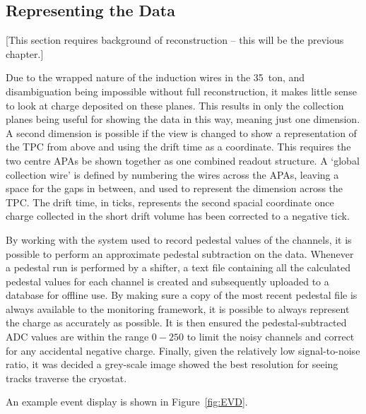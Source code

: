 \subsection{Representing the Data}\label{RepresentingEVDData}

[This section requires background of reconstruction -- this will be the previous chapter.]

Due to the wrapped nature of the induction wires in the 35~ton, and disambiguation being impossible without full reconstruction, it makes little sense to look at charge deposited on these planes.  This results in only the collection planes being useful for showing the data in this way, meaning just one dimension.  A second dimension is possible if the view is changed to show a representation of the TPC from above and using the drift time as a coordinate.  This requires the two centre APAs be shown together as one combined readout structure.  A `global collection wire' is defined by numbering the wires across the APAs, leaving a space for the gaps in between, and used to represent the dimension across the TPC.  The drift time, in ticks, represents the second spacial coordinate once charge collected in the short drift volume has been corrected to a negative tick.

By working with the system used to record pedestal values of the channels, it is possible to perform an approximate pedestal subtraction on the data.  Whenever a pedestal run is performed by a shifter, a text file containing all the calculated pedestal values for each channel is created and subsequently uploaded to a database for offline use.  By making sure a copy of the most recent pedestal file is always available to the monitoring framework, it is possible to always represent the charge as accurately as possible.  It is then ensured the pedestal-subtracted ADC values are within the range $0-250$ to limit the noisy channels and correct for any accidental negative charge.  Finally, given the relatively low signal-to-noise ratio, it was decided a grey-scale image showed the best resolution for seeing tracks traverse the cryostat.

An example event display is shown in Figure~\ref{fig:EVD}.


